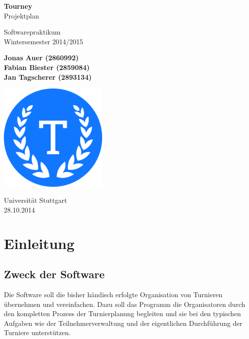 \documentclass[11pt]{article}
\begin{document}
\begin{titlepage}
	\begin{center}
		\vspace*{1cm}

		\Huge
		\textbf{Tourney}\\
		Projektplan

		\vspace{0.5cm}
		\LARGE
		Softwarepraktikum\\
		\Large
		Wintersemester 2014/2015

		\vspace{1.5cm}

		\large
		\textbf{Jonas Auer (2860992)\\
				 Fabian Biester (2859084)\\
				 Jan Tagscherer (2893134)}

		\vfill

		\includegraphics[width=0.4\textwidth]{Logo.png}

		\vspace{1.5cm}

		\Large
		Universität Stuttgart\\
		28.10.2014
	\end{center}
\end{titlepage}

\newpage

\tableofcontents
\newpage

\section{Einleitung}

\subsection{Zweck der Software}

Die Software soll die bisher händisch erfolgte Organisation von Turnieren übernehmen und vereinfachen. Dazu soll das Programm die Organisatoren durch den kompletten Prozess der Turnierplanung begleiten und sie bei den typischen Aufgaben wie der Teilnehmerverwaltung und der eigentlichen Durchführung der Turniere unterstützen.
\end{document}
